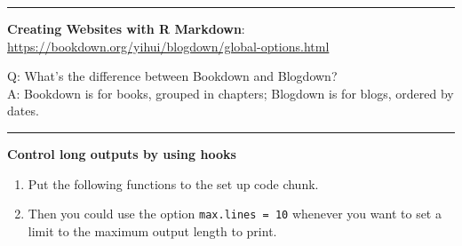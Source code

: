 \documentclass[
]{book}
\theoremstyle{definition}
\theoremstyle{definition}
\theoremstyle{definition}
\theoremstyle{definition}
\theoremstyle{remark}
\begin{document}
\begin{center}\rule{0.5\linewidth}{0.5pt}\end{center}

\textbf{Creating Websites with R Markdown}: \url{https://bookdown.org/yihui/blogdown/global-options.html}

Q: What's the difference between Bookdown and Blogdown?\\
A: Bookdown is for books, grouped in chapters; Blogdown is for blogs, ordered by dates.

\begin{center}\rule{0.5\linewidth}{0.5pt}\end{center}

\textbf{Control long outputs by using hooks}

\begin{enumerate}
\def\labelenumi{\arabic{enumi}.}
\item
  Put the following functions to the set up code chunk.
\item
  Then you could use the option \texttt{max.lines\ =\ 10} whenever you want to set a limit to the maximum output length to print.
\end{enumerate}
\end{document}
